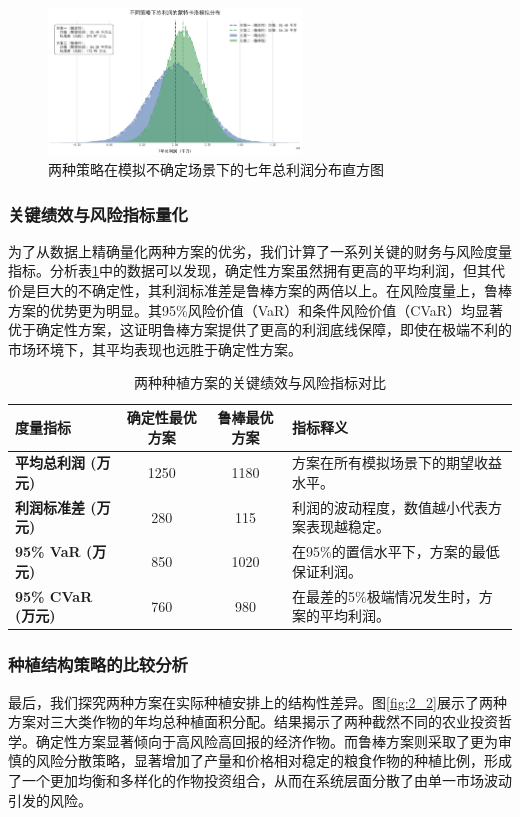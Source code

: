 \documentclass[withoutpreface,bwprint]{cumcmthesis} %
\begin{document}
\begin{figure}[htbp]
	\centering
	\includegraphics[width=0.6\textwidth]{figures/2_1.png}
	\caption{两种策略在模拟不确定场景下的七年总利润分布直方图}
	\label{fig:2_1}
\end{figure}

\subsubsection{关键绩效与风险指标量化}

为了从数据上精确量化两种方案的优劣，我们计算了一系列关键的财务与风险度量指标。分析表\ref{tab:risk_metrics}中的数据可以发现，确定性方案虽然拥有更高的平均利润，但其代价是巨大的不确定性，其利润标准差是鲁棒方案的两倍以上。在风险度量上，鲁棒方案的优势更为明显。其95\%风险价值（VaR）和条件风险价值（CVaR）均显著优于确定性方案，这证明鲁棒方案提供了更高的利润底线保障，即使在极端不利的市场环境下，其平均表现也远胜于确定性方案。

\begin{table}[htbp]
	\centering
	\small
	\caption{两种种植方案的关键绩效与风险指标对比}
	\label{tab:risk_metrics}
	\begin{tabular}{lccp{7cm}}
		\toprule
		度量指标                    & 确定性最优方案 & 鲁棒最优方案 & 指标释义                    \\
		\midrule
		\textbf{平均总利润 (万元)}     & 1250    & 1180   & 方案在所有模拟场景下的期望收益水平。      \\
		\textbf{利润标准差 (万元)}     & 280     & 115    & 利润的波动程度，数值越小代表方案表现越稳定。  \\
		\textbf{95\% VaR (万元)}  & 850     & 1020   & 在95\%的置信水平下，方案的最低保证利润。  \\
		\textbf{95\% CVaR (万元)} & 760     & 980    & 在最差的5\%极端情况发生时，方案的平均利润。 \\
		\bottomrule
	\end{tabular}
\end{table}

\subsubsection{种植结构策略的比较分析}
最后，我们探究两种方案在实际种植安排上的结构性差异。图\ref{fig:2_2}展示了两种方案对三大类作物的年均总种植面积分配。结果揭示了两种截然不同的农业投资哲学。确定性方案显著倾向于高风险高回报的经济作物。而鲁棒方案则采取了更为审慎的风险分散策略，显著增加了产量和价格相对稳定的粮食作物的种植比例，形成了一个更加均衡和多样化的作物投资组合，从而在系统层面分散了由单一市场波动引发的风险。
\end{document}
